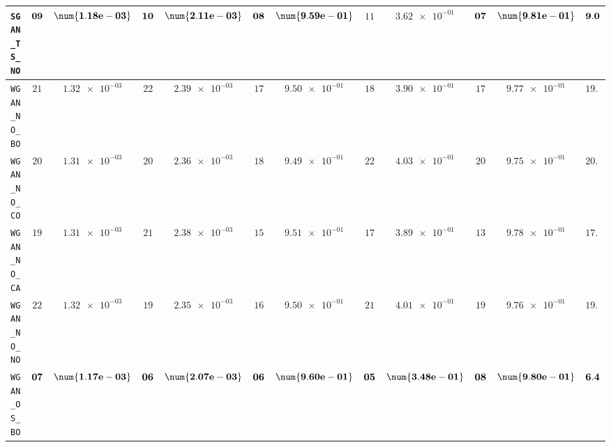 \begin{table}[H]
\begin{tabularx}{\textwidth}{l||cC|cC|cC|cC|cC||c}
		\texttt{SGAN\_TS\_NO} & $\bf 09$ & $\bf \num{1.18e-03}$ & $\bf 10$ & $\bf \num{2.11e-03}$ & $\bf 08$ & $\bf \num{9.59e-01}$ & $ 11$ & $ \num{3.62e-01}$ & $\bf 07$ & $\bf \num{9.81e-01}$ & $\bf 9.0$  \\ \hline
		\texttt{WGAN\_NO\_BO} & $ 21$ & $ \num{1.32e-03}$ & $ 22$ & $ \num{2.39e-03}$ & $ 17$ & $ \num{9.50e-01}$ & $ 18$ & $ \num{3.90e-01}$ & $ 17$ & $ \num{9.77e-01}$ & $ 19.0$  \\
		\texttt{WGAN\_NO\_CO} & $ 20$ & $ \num{1.31e-03}$ & $ 20$ & $ \num{2.36e-03}$ & $ 18$ & $ \num{9.49e-01}$ & $ 22$ & $ \num{4.03e-01}$ & $ 20$ & $ \num{9.75e-01}$ & $ 20.0$  \\
		\texttt{WGAN\_NO\_CA} & $ 19$ & $ \num{1.31e-03}$ & $ 21$ & $ \num{2.38e-03}$ & $ 15$ & $ \num{9.51e-01}$ & $ 17$ & $ \num{3.89e-01}$ & $ 13$ & $ \num{9.78e-01}$ & $ 17.0$  \\
		\texttt{WGAN\_NO\_NO} & $ 22$ & $ \num{1.32e-03}$ & $ 19$ & $ \num{2.35e-03}$ & $ 16$ & $ \num{9.50e-01}$ & $ 21$ & $ \num{4.01e-01}$ & $ 19$ & $ \num{9.76e-01}$ & $ 19.4$  \\
		\texttt{WGAN\_OS\_BO} & $\bf 07$ & $\bf \num{1.17e-03}$ & $\bf 06$ & $\bf \num{2.07e-03}$ & $\bf 06$ & $\bf \num{9.60e-01}$ & $\bf 05$ & $\bf \num{3.48e-01}$ & $\bf 08$ & $\bf \num{9.80e-01}$ & $\bf 6.4$  \\

\end{tabularx}
\end{table}
